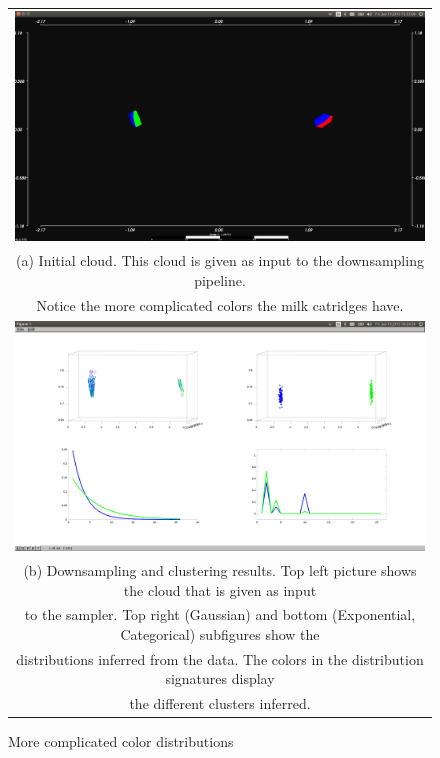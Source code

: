 \documentclass [twoside,hidelinks]{article}
\begin{document}
\begin{figure}
\begin{tabular}{c}
  \includegraphics [width=1\textwidth]{clusterings/coloursSource} \\
   (a) Initial cloud. This cloud is given as input to the downsampling pipeline.    \\
   Notice the more complicated colors the milk catridges have. \\
   \includegraphics [width=1\textwidth]{clusterings/coloursCorrect} \\
  (b) Downsampling and clustering results. Top left picture shows the cloud that is given as input\\
 to the sampler. Top right (Gaussian) and bottom (Exponential, Categorical) subfigures show the \\
 distributions inferred from the data. The colors in the distribution signatures display \\
 the different clusters inferred.\end{tabular}
\caption{More complicated color distributions}
  \label{pcl:clust2}
\end{figure}
\end{document}
